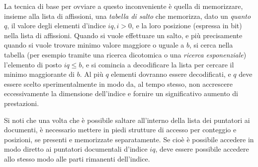 La tecnica di base per ovviare a questo inconveniente è quella di memorizzare, insieme alla lista di affissioni, una \textit{tabella di salto} che memorizza, dato un \textit{quanto} $q$, il valore degli elementi d'indice $iq, i > 0$, e la loro posizione (espressa in bit) nella lista di affissioni. Quando si vuole effettuare un salto, e più precisamente quando si vuole trovare minimo valore maggiore o uguale a $b$, si cerca nella tabella (per esempio tramite una ricerca dicotomica o una \textit{ricerca esponenziale}) l'elemento di posto $iq \leq b$, e si comincia a decodificare la lista per cercare il minimo maggiorante di $b$. Al più $q$ elementi dovranno essere decodificati, e $q$ deve essere scelto sperimentalmente in modo da, al tempo stesso, non accrescere eccessivamente la dimensione dell'indice e fornire un significativo aumento di prestazioni.

Si noti che una volta che è possibile saltare all'interno della lista dei puntatori ai documenti, è necessario mettere in piedi strutture di accesso per conteggio e posizioni, se presenti e memorizzate separatamente. Se cioè è possibile accedere in modo diretto ai puntatori documentali d'indice $iq$, deve essere possibile accedere allo stesso modo alle parti rimanenti dell'indice.
